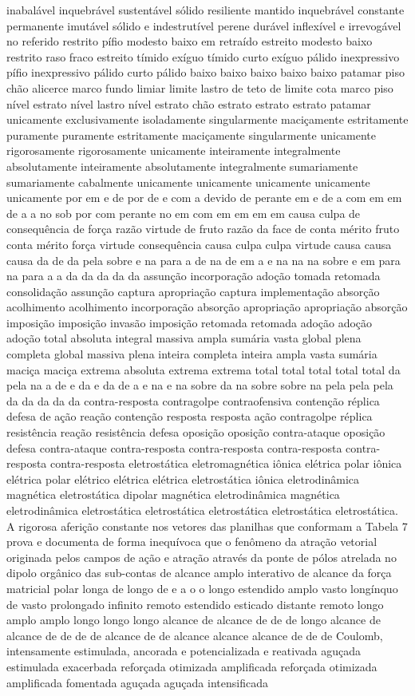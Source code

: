 inabalável inquebrável sustentável sólido resiliente mantido inquebrável constante permanente imutável sólido e indestrutível perene durável inflexível e irrevogável no referido restrito pífio modesto baixo em retraído estreito modesto baixo restrito raso fraco estreito tímido exíguo tímido curto exíguo pálido inexpressivo pífio inexpressivo pálido curto pálido baixo baixo baixo baixo baixo patamar piso chão alicerce marco fundo limiar limite lastro de teto de limite cota marco piso nível estrato nível lastro nível estrato chão estrato estrato estrato patamar unicamente exclusivamente isoladamente singularmente maciçamente estritamente puramente puramente estritamente maciçamente singularmente unicamente rigorosamente rigorosamente unicamente inteiramente integralmente absolutamente inteiramente absolutamente integralmente sumariamente sumariamente cabalmente unicamente unicamente unicamente unicamente unicamente por em e de por de e com a devido de perante em e de a com em em de a a no sob por com perante no em com em em em em causa culpa de consequência de força razão virtude de fruto razão da face de conta mérito fruto conta mérito força virtude consequência causa culpa culpa virtude causa causa causa da de da pela sobre e na para a de na de em a e na na na sobre e em para na para a a da da da da da assunção incorporação adoção tomada retomada consolidação assunção captura apropriação captura implementação absorção acolhimento acolhimento incorporação absorção apropriação apropriação absorção imposição imposição invasão imposição retomada retomada adoção adoção adoção total absoluta integral massiva ampla sumária vasta global plena completa global massiva plena inteira completa inteira ampla vasta sumária maciça maciça extrema absoluta extrema extrema total total total total total da pela na a de e da e da de a e na e na sobre da na sobre sobre na pela pela pela da da da da da contra-resposta contragolpe contraofensiva contenção réplica defesa de ação reação contenção resposta resposta ação contragolpe réplica resistência reação resistência defesa oposição oposição contra-ataque oposição defesa contra-ataque contra-resposta contra-resposta contra-resposta contra-resposta contra-resposta eletrostática eletromagnética iônica elétrica polar iônica elétrica polar elétrico elétrica elétrica eletrostática iônica eletrodinâmica magnética eletrostática dipolar magnética eletrodinâmica magnética eletrodinâmica eletrostática eletrostática eletrostática eletrostática eletrostática. A rigorosa aferição constante nos vetores das planilhas que conformam a Tabela 7 prova e documenta de forma inequívoca que o fenômeno da atração vetorial originada pelos campos de ação e atração através da ponte de pólos atrelada no dipolo orgânico das sub-contas de alcance amplo interativo de alcance da força matricial polar longa de longo de e a o o longo estendido amplo vasto longínquo de vasto prolongado infinito remoto estendido esticado distante remoto longo amplo amplo longo longo longo alcance de alcance de de de longo alcance de alcance de de de de alcance de de alcance alcance alcance de de de Coulomb, intensamente estimulada, ancorada e potencializada e reativada aguçada estimulada exacerbada reforçada otimizada amplificada reforçada otimizada amplificada fomentada aguçada aguçada intensificada 